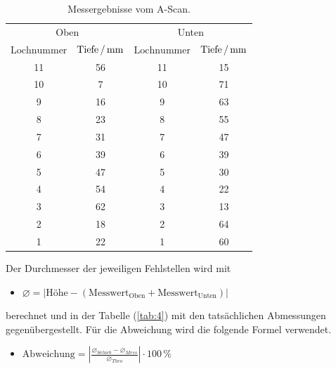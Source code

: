 \begin{table}[H]
  \centering
  \caption{Messergebnisse vom A-Scan.}
  \label{tab:3}
  \begin{tabular}{c c c c}
    \toprule
    \multicolumn{2}{c}{Oben} & \multicolumn{2}{c}{Unten} \\
    \cmidrule(lr){1-2}\cmidrule(lr){3-4}
    $\text{Lochnummer}$ & $\text{Tiefe} \,/\, \si[per-mode=fraction]{\milli\meter}$ & $\text{Lochnummer}$ & $\text{Tiefe} \,/\, \si[per-mode=fraction]{\milli\meter}$\\
    \midrule
    11  & 56 & 11 & 15\\
    10  & 7  & 10 & 71\\
    9   & 16 & 9 & 63\\
    8   & 23 & 8 & 55\\
    7   & 31 & 7 & 47\\
    6   & 39 & 6 & 39\\
    5   & 47 & 5 & 30\\
    4   & 54 & 4 & 22\\
    3   & 62 & 3 & 13\\
    2   & 18 & 2 & 64\\
    1   & 22 & 1 & 60\\
  \bottomrule
  \end{tabular}
\end{table}

Der Durchmesser der jeweiligen Fehlstellen wird mit
\begin{itemize}
  \item $\diameter = |\text{Höhe} - (\text{Messwert}_{\text{Oben}} + \text{Messwert}_{\text{Unten}} )|$
\end{itemize}
berechnet und in der Tabelle (\ref{tab:4}) mit den tatsächlichen Abmessungen gegenübergestellt.
Für die Abweichung wird die folgende Formel verwendet.
\begin{itemize}
  \item $\text{Abweichung} = |\frac{\diameter_{Schieb} - \diameter_{Mess}}{\diameter_{Theo}}| \cdot 100 \, \%$
\end{itemize}

